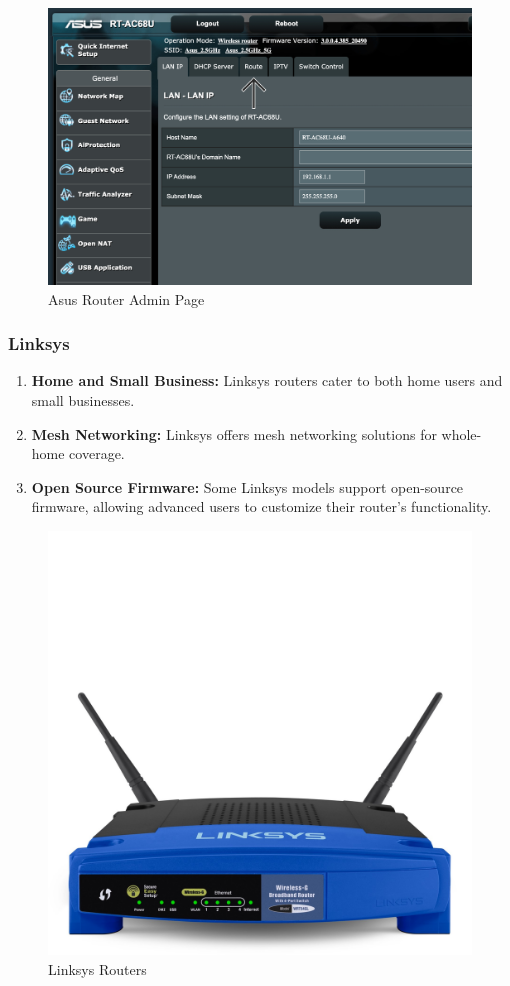 \documentclass[11pt]{article}
\begin{document}
\begin{figure}[H]
  \centering
  \includegraphics[width=.95\textwidth]{asus router admin page/asus router admin page_9.jpg}
  \caption{Asus Router Admin Page}
\end{figure}

\subsubsection{Linksys}
\begin{enumerate}
  \item \textbf{Home and Small Business:} Linksys routers cater to both home users and small businesses.

  \item \textbf{Mesh Networking:} Linksys offers mesh networking solutions for whole-home coverage.

  \item \textbf{Open Source Firmware:} Some Linksys models support open-source firmware, allowing advanced users to customize their router's functionality.
\end{enumerate}

\begin{figure}[H]
  \centering
  \includegraphics[width=.45\textwidth]{linksys routers/linksys routers_9.jpg}
  \caption{Linksys Routers}
\end{figure}
\end{document}
